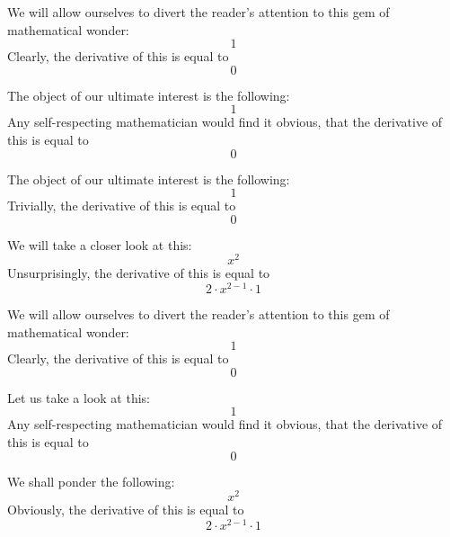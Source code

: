 \documentclass{article}
\begin{document}
We will allow ourselves to divert the reader's attention to this gem of mathematical wonder:
\begin{equation}
1 
\end{equation}
Clearly, the derivative of this is equal to
\begin{equation}
0 
\end{equation}

The object of our ultimate interest is the following:
\begin{equation}
1 
\end{equation}
Any self-respecting mathematician would find it obvious, that the derivative of this is equal to
\begin{equation}
0 
\end{equation}

The object of our ultimate interest is the following:
\begin{equation}
1 
\end{equation}
Trivially, the derivative of this is equal to
\begin{equation}
0 
\end{equation}

We will take a closer look at this:
\begin{equation}
x ^{2 } 
\end{equation}
Unsurprisingly, the derivative of this is equal to
\begin{equation}
2 \cdot x ^{2 - 1 } \cdot 1 
\end{equation}

We will allow ourselves to divert the reader's attention to this gem of mathematical wonder:
\begin{equation}
1 
\end{equation}
Clearly, the derivative of this is equal to
\begin{equation}
0 
\end{equation}

Let us take a look at this:
\begin{equation}
1 
\end{equation}
Any self-respecting mathematician would find it obvious, that the derivative of this is equal to
\begin{equation}
0 
\end{equation}

We shall ponder the following:
\begin{equation}
x ^{2 } 
\end{equation}
Obviously, the derivative of this is equal to
\begin{equation}
2 \cdot x ^{2 - 1 } \cdot 1 
\end{equation}
\end{document}
